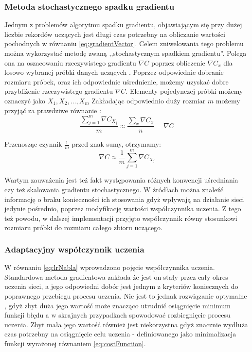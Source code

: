 \documentclass[12pt,twoside]{article}
\begin{document}
\subsubsection{Metoda stochastycznego spadku gradientu}
Jednym z problemów algorytmu spadku gradientu, objawiającym się przy dużej liczbie rekordów uczących \cite{nndl} jest długi czas potrzebny na obliczanie wartości pochodnych w równaniu \ref{eq:gradientVector}.
Celem zniwelowania tego problemu można wykorzystać metodę zwaną ,,stochastycznym spadkiem gradientu''.
Polega ona na oszacowaniu rzeczywistego gradientu $\nabla C$ poprzez obliczenie $\nabla C_x$ dla losowo wybranej próbki danych uczących \cite{nndl} \cite{nnd}.
Poprzez odpowiednie dobranie rozmiaru próbek, oraz ich odpowiednie uśrednienie, możemy uzyskać dobre przybliżenie rzeczywistego gradientu $\nabla C$.\cite{nndl}
Elementy pojedynczej próbki możemy oznaczyć jako $X_1, X_2, \ldots , X_m$
Zakładając odpowiednio duży rozmiar $m$ możemy przyjąć za prawdziwe równanie \cite{nndl}:
\begin{equation}
	\label{eq:stochasticGradient}
	\frac{ \sum_{j=1}^{m} \nabla C_{X_j}}{m} \approx \frac{ \sum_x \nabla C_x}{n} = \nabla C
\end{equation}

Przenosząc czynnik $\frac{1}{m}$ przed znak sumy, otrzymamy:
\begin{equation}
	\label{eq:stochasticGradientFinal}
	\nabla C \approx \frac{1}{m} \sum_{j=1}^{m} \nabla C_{X_j}
\end{equation}

Wartym zauważenia jest też fakt występowania różnych konwencji uśredniania czy też skalowania gradientu stochastycznego. \cite{nndl}
W źródłach \cite{nndl} można znaleźć informację o braku konieczności ich stosowania gdyż wpływają na działanie sieci jedynie pośrednio, poprzez modyfikację wartości współczynnika uczenia.
Z tego też powodu, w dalszej implementacji przyjęto współczynnik równy stosunkowi rozmiaru próbki do rozmiaru całego zbioru uczącego.

\subsubsection{Adaptacyjny współczynnik uczenia}
W równaniu \ref{eq:lrNabla} wprowadzono pojęcie współczynnika uczenia.
Standardowa metoda gradientowa zakłada że jest on stały przez cały okres uczenia sieci, a jego odpowiedni dobór jest jednym z kryteriów koniecznych do poprawnego przebiegu procesu uczenia.
Nie jest to jednak rozwiązanie optymalne \cite{nnd}, gdyż zbyt duża jego wartość może znacząco utrudnić osiągnięcie minimum funkcji błędu a w skrajnych przypadkach spowodować rozbiegnięcie procesu uczenia.
Zbyt mała jego wartość również jest niekorzystna gdyż znacznie wydłuża czas potrzebny na osiągnięcie celu uczenia - definiowanego jako minimalizacja funkcji wyrażonej równaniem \ref{eq:costFunction}.
\end{document}
